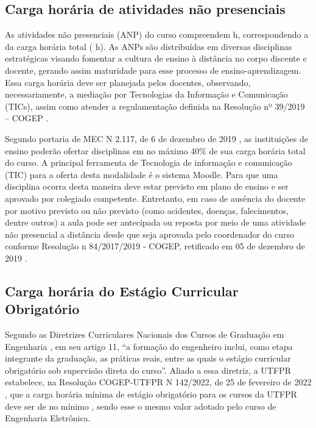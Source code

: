 \subsection{Carga horária de atividades não presenciais}

As atividades não presenciais (ANP) do curso compreendem \the\value{horasANP} h, correspondendo a \percentagem{\the\value{horasANP}}{\the\value{horasT}} da carga horária total (\the\value{horasT} h). As ANPs são distribuídas em diversas disciplinas estratégicas visando fomentar a cultura de ensino à distância no corpo discente e docente, gerando assim maturidade para esse processo de ensino-aprendizagem. Essa carga horária deve ser planejada pelos docentes, observando, necessariamente, a mediação por Tecnologias da Informação e Comunicação (TICs), assim como atender a regulamentação definida na Resolução nº 39/2019 – COGEP \cite{cogep39}. 

Segundo portaria de MEC N\textordmasculine{} 2.117, de 6 de dezembro de 2019 \cite{portaria2117mec}, as instituições de ensino poderão ofertar disciplinas em no máximo 40\% de sua carga horária total do curso. A principal ferramenta de Tecnologia de informação e comunicação (TIC) para a oferta desta modalidade é o sistema Moodle. Para que uma disciplina ocorra desta maneira deve estar previsto em plano de ensino e ser aprovado por colegiado competente. Entretanto, em caso de ausência do docente por motivo previsto ou não previsto (como acidentes, doenças, falecimentos, dentre outros) a aula pode ser antecipada ou reposta por meio de uma atividade não presencial a distância desde que seja aprovada pelo coordenador do curso conforme Resolução n\textordmasculine{} 84/2017/2019 - COGEP, retificado em 05 de dezembro de 2019 \cite{cogep84}.


\subsection{Carga horária do Estágio Curricular Obrigatório}

Segundo as Diretrizes Curriculares Nacionais dos Cursos de Graduação em Engenharia \cite{dcneng}, em seu artigo 11, ``a formação  do  engenheiro  inclui,  como  etapa  integrante da  graduação, as práticas reais, entre as quais o estágio curricular obrigatório sob supervisão direta do curso''. Aliado a essa diretriz, a UTFPR estabelece, na Resolução COGEP-UTFPR N\textordmasculine{} 142/2022, de 25 de fevereiro de 2022 \cite{cogep142}, que a carga horária mínima de estágio obrigatório para os cursos da UTFPR deve ser de no mínimo \the\value{horasEST}, sendo esse o mesmo valor adotado pelo curso de Engenharia Eletrônica.

